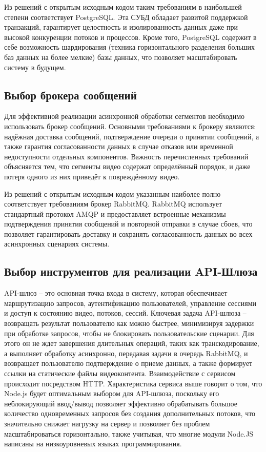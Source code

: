 	Из решений с открытым исходным кодом таким требованиям в наибольшей степени соответствует PostgreSQL. Эта СУБД обладает развитой поддержкой транзакций, гарантирует целостность и изолированность данных даже при высокой конкуренции потоков и процессов. Кроме того, PostgreSQL содержит в себе возможность шардирования (техника горизонтального разделения больших баз данных на более мелкие) базы данных, что позволяет масштабировать систему в будущем.

	\subsection{Выбор брокера сообщений}

	Для эффективной реализации асинхронной обработки сегментов необходимо использовать брокер сообщений. Основными требованиями к брокеру являются: надёжная доставка сообщений, подтверждение очереди о принятии сообщений, а также гарантия согласованности данных в случае отказов или временной недоступности отдельных компонентов. Важность перечисленных требований объясняется тем, что сегменты видео содержат определённый порядок, и даже потеря одного из них приведёт к повреждённому видео.

	Из решений с открытым исходным кодом указанным наиболее полно соответствует требованиям брокер RabbitMQ. RabbitMQ использует стандартный протокол AMQP и предоставляет встроенные механизмы подтверждения принятия сообщений и повторной отправки в случае сбоев, что позволяет гарантировать доставку и сохранять согласованность данных во всех асинхронных сценариях системы.

	\subsection{Выбор инструментов для реализации API-Шлюза}
	
	API-шлюз – это основная точка входа в систему, которая обеспечивает маршрутизацию запросов, аутентификацию пользователей, управление сессиями и доступ к состоянию видео, потоков, сессий. Ключевая задача API-шлюза – возвращать результат пользователю как можно быстрее, минимизируя задержки при обработке запросов, чтобы не блокировать пользовательские сценарии. Для этого он не ждет завершения длительных операций, таких как транскодирование, а выполняет обработку асинхронно, передавая задачи в очередь RabbitMQ, и возвращает пользователю подтверждение о приеме данных, а также формирует ссылки на статические файлы видеоконтента. Взаимодействие с сервисом происходит посредством HTTP. Характеристика сервиса выше говорит о том, что Node.js будет оптимальным выбором для API-шлюза, поскольку его неблокирующий ввод/вывод позволяет эффективно обрабатывать большое количество одновременных запросов без создания дополнительных потоков, что значительно снижает нагрузку на сервер и позволяет без проблем масштабироваться горизонтально, также учитывая, что многие модули Node.JS написаны на низкоуровневых языках программирования.

